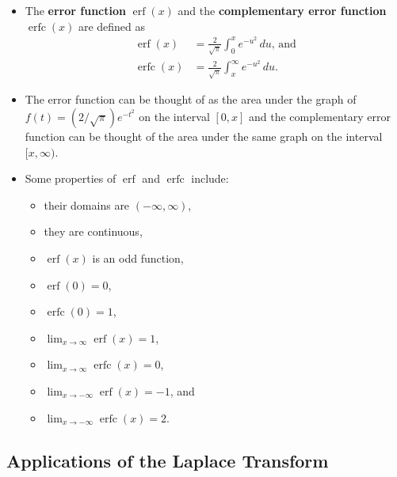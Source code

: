 \documentclass{article}
\DeclareMathOperator{\erf}{erf}
\DeclareMathOperator{\erfc}{erfc}
\begin{document}
\begin{itemize}
  \item The \textbf{error function} $\erf(x)$ and the \textbf{complementary error function} $\erfc(x)$ are defined as \begin{align*}
          \erf(x)  & = \frac{2}{\sqrt{\pi}} \int_0^x e^{-u^2} \,du \text{, and} \\
          \erfc(x) & = \frac{2}{\sqrt{\pi}} \int_x^\infty e^{-u^2} \,d u.
        \end{align*}

  \item The error function can be thought of as the area under the graph of $f(t) = (2 / \sqrt{\pi}) e^{-t^2}$ on the interval $[0, x]$ and the complementary error function can be thought of the area under the same graph on the interval $[x, \infty)$.

  \item Some properties of $\erf$ and $\erfc$ include:

        \begin{itemize}
          \item their domains are $(-\infty, \infty)$,

          \item they are continuous,

          \item $\erf(x)$ is an odd function,

          \item $\erf(0) = 0$,

          \item $\erfc(0) = 1$,

          \item $\lim_{x \rightarrow \infty} \erf(x) = 1$,

          \item $\lim_{x \rightarrow \infty} \erfc(x) = 0$,

          \item $\lim_{x \rightarrow -\infty} \erf(x) = -1$, and

          \item $\lim_{x \rightarrow -\infty} \erfc(x) = 2$.
        \end{itemize}
\end{itemize}

\subsection{Applications of the Laplace Transform}
\end{document}
